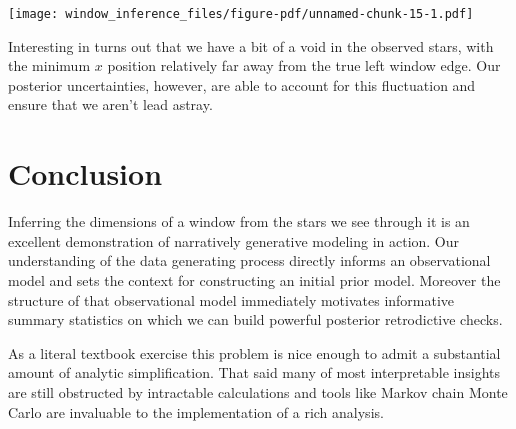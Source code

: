 \documentclass[
  letterpaper,
  DIV=11,
  numbers=noendperiod]{scrartcl}
\newenvironment{Shaded}{\begin{snugshade}}{\end{snugshade}}
\newcommand{\AttributeTok}[1]{\textcolor[rgb]{0.40,0.45,0.13}{#1}}
\newcommand{\DecValTok}[1]{\textcolor[rgb]{0.68,0.00,0.00}{#1}}
\newcommand{\FunctionTok}[1]{\textcolor[rgb]{0.28,0.35,0.67}{#1}}
\newcommand{\NormalTok}[1]{\textcolor[rgb]{0.00,0.23,0.31}{#1}}
\newcommand{\SpecialCharTok}[1]{\textcolor[rgb]{0.37,0.37,0.37}{#1}}
\newcommand{\StringTok}[1]{\textcolor[rgb]{0.13,0.47,0.30}{#1}}
\begin{document}
\begin{Shaded}
\end{Shaded}

\texttt{[image: window\_inference\_files/figure-pdf/unnamed-chunk-15-1.pdf]}

Interesting in turns out that we have a bit of a void in the observed
stars, with the minimum \(x\) position relatively far away from the true
left window edge. Our posterior uncertainties, however, are able to
account for this fluctuation and ensure that we aren't lead astray.

\section{Conclusion}\label{conclusion}

Inferring the dimensions of a window from the stars we see through it is
an excellent demonstration of narratively generative modeling in action.
Our understanding of the data generating process directly informs an
observational model and sets the context for constructing an initial
prior model. Moreover the structure of that observational model
immediately motivates informative summary statistics on which we can
build powerful posterior retrodictive checks.

As a literal textbook exercise this problem is nice enough to admit a
substantial amount of analytic simplification. That said many of most
interpretable insights are still obstructed by intractable calculations
and tools like Markov chain Monte Carlo are invaluable to the
implementation of a rich analysis.
\end{document}
